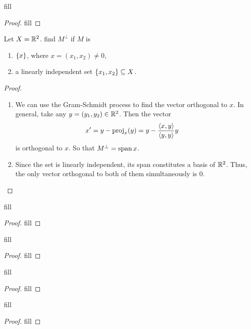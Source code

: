 \begin{exercise}{3}
fill
\end{exercise}
\begin{proof}
fill
\end{proof}

\begin{exercise}{5}
Let $X=\mathbb{R}^2$.
find $M^\perp$ if $M$ is
\begin{enumerate}
    \item $\{x\}$, where $x = (x_1,x_2) \neq 0$,
    \item a linearly independent set $\{x_1,x_2\}\subseteq X$.
\end{enumerate}
\end{exercise}
\begin{proof}
\begin{enumerate}
    \item We can use the Gram-Schmidt process to find the vector orthogonal to $x$.
    In general, take any $y = (y_1,y_2)\in\mathbb{R}^2$.
    Then the vector
    \begin{align*}
        x' = y -\text{proj}_x(y) = y - \frac{\langle x,y\rangle}{\langle y,y\rangle}y
    \end{align*}
    is orthogonal to $x$.
    So that $M^\perp = \operatorname*{span}{x}$.
    \item Since the set is linearly independent, its span constitutes a basis of $\mathbb{R}^2$. 
    Thus, the only vector orthogonal to both of them simultaneously is 0.
\end{enumerate}
\end{proof}

\begin{exercise}{6}
fill
\end{exercise}
\begin{proof}
fill
\end{proof}

\begin{exercise}{7}
fill
\end{exercise}
\begin{proof}
fill
\end{proof}

\begin{exercise}{9}
fill
\end{exercise}
\begin{proof}
fill
\end{proof}

\begin{exercise}{10}
fill
\end{exercise}
\begin{proof}
fill
\end{proof}